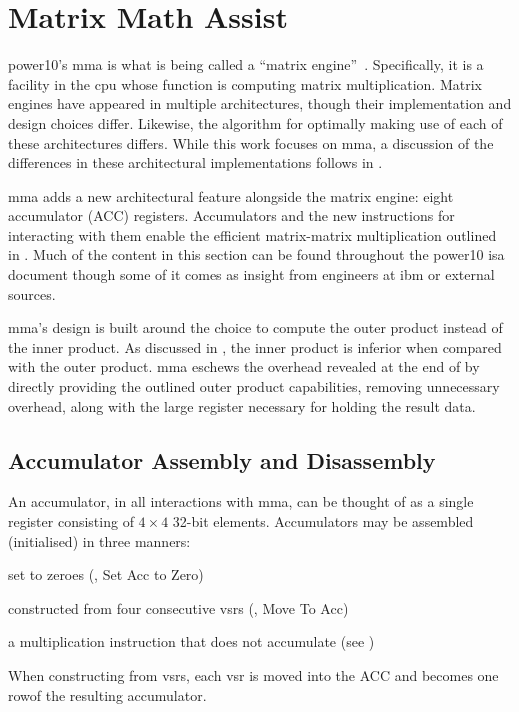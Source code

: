 \documentclass[\main/thesis.tex]{subfiles}
\begin{document}
\chapter{Matrix Math Assist}
\label{cha:mma}

\Gls{power10}'s \gls{mma} is what is being called a ``matrix engine''~\autocite{domke2020matrix}.
Specifically, it is a facility in the \gls{cpu} whose function is computing matrix multiplication.
Matrix engines have appeared in multiple architectures, though their implementation and design choices differ.
Likewise, the algorithm for optimally making use of each of these architectures differs.
While this work focuses on \gls{mma}, a discussion of the differences in these architectural implementations follows in .

\gls{mma} adds a new architectural feature alongside the matrix engine: eight accumulator (ACC) registers.
Accumulators and the new instructions for interacting with them enable the efficient matrix-matrix multiplication outlined in .
Much of the content in this section can be found throughout the \gls{power10} \gls{isa} document though some of it comes as insight from engineers at \gls{ibm} or external sources.

\Gls{mma}'s design is built around the choice to compute the outer product instead of the inner product.
As discussed in , the inner product is inferior when compared with the outer product.
\Gls{mma} eschews the overhead revealed at the end of  by directly providing the outlined outer product capabilities, removing unnecessary overhead, along with the large register necessary for holding the result data.

\section{Accumulator Assembly and Disassembly}
\label{sec:assDis}
An accumulator, in all interactions with \gls{mma}, can be thought of as a single register consisting of $4 \times 4$ 32-bit elements.
Accumulators may be assembled (initialised) in three manners:
\begin{enumerate*}[itemjoin*={{ and }}, label=\textbf{(\arabic*)}, after={.}]
  \item set to zeroes (, Set Acc to Zero)
  \item constructed from four consecutive \glspl{vsr} (, Move To Acc)
  \item a multiplication instruction that does not accumulate (see )
\end{enumerate*}
When constructing from \glspl{vsr}, each \gls{vsr} is moved into the ACC and becomes one row\footnotemark of the resulting accumulator.
\end{document}
